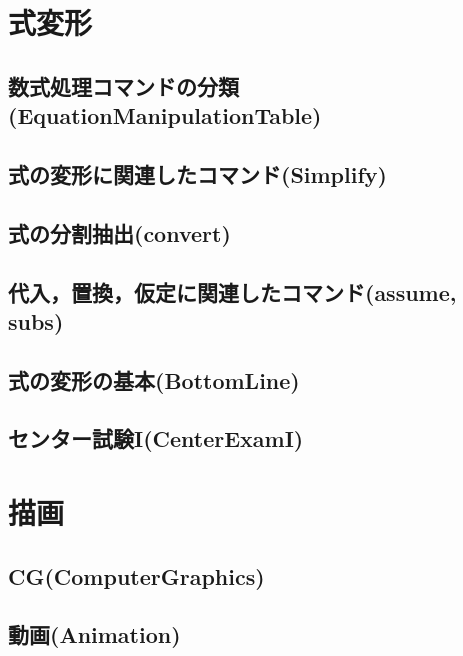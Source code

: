 \chapter{式変形}
\section{数式処理コマンドの分類(EquationManipulationTable)}
 

\pagebreak
\section{式の変形に関連したコマンド(Simplify)}
 
 
 

\pagebreak
\section{式の分割抽出(convert)}
 
 
 

\pagebreak
\section{代入，置換，仮定に関連したコマンド(assume, subs)}
 

\pagebreak
\section{式の変形の基本(BottomLine)}
 

\pagebreak
\section{センター試験I(CenterExamI)}
 
 
 
 

\chapter{描画}
\section{CG(ComputerGraphics)}
 

\pagebreak
\section{動画(Animation)}
 

